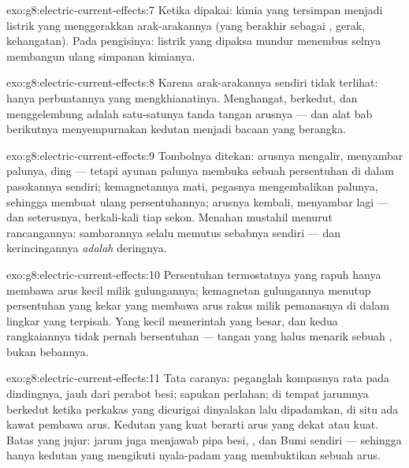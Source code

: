 \begin{solution}{exo:g8:electric-current-effects:7}
Ketika dipakai:  kimia yang tersimpan menjadi  listrik
yang menggerakkan arak-arakannya (yang berakhir sebagai , gerak,
kehangatan). Pada pengisinya:  listrik yang dipaksa mundur
menembus selnya membangun ulang simpanan kimianya.
\end{solution}

\begin{solution}{exo:g8:electric-current-effects:8}
Karena arak-arakannya sendiri tidak terlihat: hanya perbuatannya yang
mengkhianatinya. Menghangat, berkedut, dan menggelembung adalah
satu-satunya tanda tangan arusnya --- dan alat bab berikutnya
menyempurnakan kedutan  menjadi bacaan yang berangka.
\end{solution}

\begin{solution}{exo:g8:electric-current-effects:9}
Tombolnya ditekan: arusnya mengalir,  menyambar
palunya, ding --- tetapi ayunan palunya membuka sebuah persentuhan di
dalam pasokannya sendiri; kemagnetannya mati, pegasnya mengembalikan
palunya, sehingga membuat ulang persentuhannya; arusnya kembali,
menyambar lagi --- dan seterusnya, berkali-kali tiap sekon. Menahan
mustahil menurut rancangannya: sambarannya selalu memutus sebabnya
sendiri --- dan kerincingannya \emph{adalah} deringnya.
\end{solution}

\begin{solution}{exo:g8:electric-current-effects:10}
Persentuhan termostatnya yang rapuh hanya membawa arus kecil milik
gulungannya; kemagnetan gulungannya menutup persentuhan yang kekar
yang membawa arus rakus milik pemanasnya di dalam lingkar yang
terpisah. Yang kecil memerintah yang besar, dan kedua rangkaiannya
tidak pernah bersentuhan --- tangan yang halus menarik sebuah ,
bukan bebannya.
\end{solution}

\begin{solution}{exo:g8:electric-current-effects:11}
Tata caranya: peganglah kompasnya rata pada dindingnya, jauh dari
perabot besi; sapukan perlahan; di tempat jarumnya berkedut ketika
perkakas yang dicurigai dinyalakan lalu dipadamkan, di situ ada kawat
pembawa arus. Kedutan yang kuat berarti arus yang dekat atau kuat.
Batas yang jujur: jarum juga menjawab pipa besi, , dan Bumi
sendiri --- sehingga hanya kedutan yang mengikuti nyala-padam
 yang membuktikan sebuah arus.
\end{solution}

